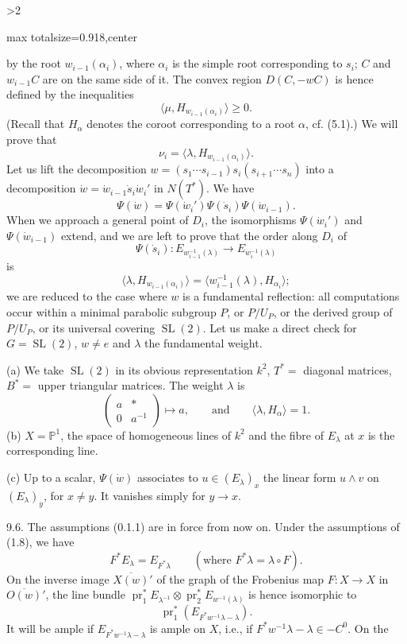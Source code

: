 \documentclass[9pt,twoside]{extarticle}
\newcommand{\EditionPage}[3]{%
  \ifnum#1>2\clearpage\fi
  \pdfbookmark[1]{Printed page #2}{en-folio-#2}%
  \hypertarget{en-physical-#1}{}%
  \noindent\begin{adjustbox}{max totalsize={\textwidth}{0.918\textheight},center}
  \begin{minipage}[t]{\textwidth}
  \fontsize{9.4}{11.1}\selectfont\justifying
  #3
  \end{minipage}
  \end{adjustbox}%
}
\begin{document}
\EditionPage{48}{149}{%
by the root \(w_{i-1}(\alpha_i)\), where \(\alpha_i\) is the simple root corresponding to \(s_i\); \(C\) and \(w_{i-1}C\) are on the same side of it. The convex region \(D(C,-wC)\) is hence defined by the inequalities \[
\langle\mu,H_{w_{i-1}(\alpha_i)}\rangle\ge0.
\] (Recall that \(H_\alpha\) denotes the coroot corresponding to a root \(\alpha\), cf. (5.1).) We will prove that \[
\tag{9.5.1}
\nu_i=\langle\lambda,H_{w_{i-1}(\alpha_i)}\rangle.
\] Let us lift the decomposition \(w=(s_1\cdots s_{i-1})s_i(s_{i+1}\cdots s_n)\) into a decomposition \(\dot w=\dot w_{i-1}\dot s_i\dot w_i'\) in \(N(T^*)\). We have \[
\Psi(\dot w)=\Psi(\dot w_i')\Psi(\dot s_i)\Psi(\dot w_{i-1}).
\] When we approach a general point of \(D_i\), the isomorphisms \(\Psi(\dot w_i')\) and \(\Psi(\dot w_{i-1})\) extend, and we are left to prove that the order along \(D_i\) of \[
\Psi(\dot s_i):E_{w_{i-1}^{-1}(\lambda)}\longrightarrow E_{w_i^{-1}(\lambda)}
\] is \[
\langle\lambda,H_{w_{i-1}(\alpha_i)}\rangle
=
\langle w_{i-1}^{-1}(\lambda),H_{\alpha_i}\rangle;
\] we are reduced to the case where \(w\) is a fundamental reflection: all computations occur within a minimal parabolic subgroup \(P\), or \(P/U_P\), or the derived group of \(P/U_P\), or its universal covering \(\operatorname{SL}(2)\). Let us make a direct check for \(G=\operatorname{SL}(2)\), \(w\ne e\) and \(\lambda\) the fundamental weight.\par

(a) We take \(\operatorname{SL}(2)\) in its obvious representation \(k^2\), \(T^*=\) diagonal matrices, \(B^*=\) upper triangular matrices. The weight \(\lambda\) is \[
\begin{pmatrix}a&*\\0&a^{-1}\end{pmatrix}\longmapsto a,
\qquad\text{and}\qquad
\langle\lambda,H_\alpha\rangle=1.
\] (b) \(X=\mathbb P^1\), the space of homogeneous lines of \(k^2\) and the fibre of \(E_\lambda\) at \(x\) is the corresponding line.\par

(c) Up to a scalar, \(\Psi(\dot w)\) associates to \(u\in(E_\lambda)_x\) the linear form \(u\wedge v\) on \((E_\lambda)_y\), for \(x\ne y\). It vanishes simply for \(y\to x\).\par

9.6. The assumptions (0.1.1) are in force from now on. Under the assumptions of (1.8), we have \[
F^*E_\lambda=E_{F^*\lambda}\qquad(\text{where }F^*\lambda=\lambda\circ F).
\] On the inverse image \(\overline{X(w)}'\) of the graph of the Frobenius map \(F:X\to X\) in \(\overline{O(w)}'\), the line bundle \(\operatorname{pr}_1^*E_{\lambda^{-1}}\otimes\operatorname{pr}_2^*E_{w^{-1}(\lambda)}\) is hence isomorphic to \[
\operatorname{pr}_1^*(E_{F^*w^{-1}\lambda-\lambda}).
\] It will be ample if \(E_{F^*w^{-1}\lambda-\lambda}\) is ample on \(X\), i.e., if \(F^*w^{-1}\lambda-\lambda\in-C^0\). On the\par
}
\end{document}
